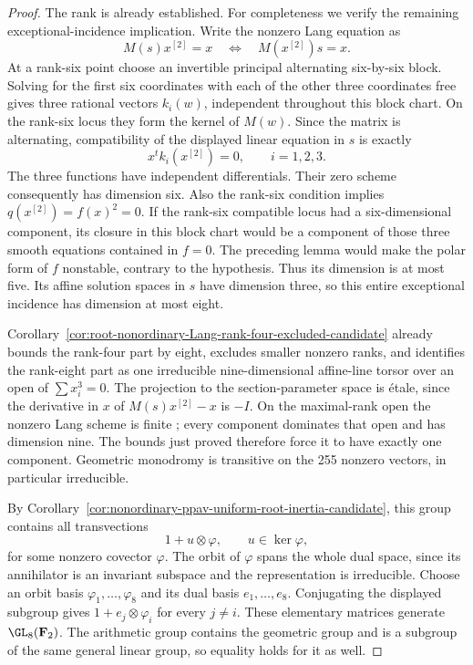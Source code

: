 \begin{proof}
The rank is already established. For completeness we verify the
remaining exceptional-incidence implication. Write the nonzero
Lang equation as
\[
                 M(s)x^{[2]}=x
       \quad\Longleftrightarrow\quad M(x^{[2]})s=x.
\]
At a rank-six point choose an invertible principal alternating
six-by-six block. Solving for the first six coordinates with each
of the other three coordinates free gives three rational vectors
$k_i(w)$, independent throughout this block chart. On the rank-six
locus they form the kernel of $M(w)$. Since the matrix is alternating,
compatibility of the displayed linear equation in $s$ is exactly
\[
                    x^t k_i(x^{[2]})=0,\qquad i=1,2,3.
\]
The three functions have independent differentials. Their zero
scheme consequently has dimension six. Also the rank-six condition
implies $q(x^{[2]})=f(x)^2=0$.
If the rank-six compatible locus had a six-dimensional component,
its closure in this block chart would be a component of those three
smooth equations contained in $f=0$. The preceding lemma would make
the polar form of $f$ nonstable, contrary to the hypothesis. Thus
its dimension is at most five. Its affine solution spaces in $s$
have dimension three, so this entire exceptional incidence has
dimension at most eight.

Corollary~\ref{cor:root-nonordinary-Lang-rank-four-excluded-candidate}
already bounds the rank-four part by eight, excludes smaller nonzero
ranks, and identifies the rank-eight part as one irreducible
nine-dimensional affine-line torsor over an open of
$\sum x_i^3=0$. The projection to the section-parameter space is
\'etale, since the derivative in $x$ of $M(s)x^{[2]}-x$ is $-I$.
On the maximal-rank open the nonzero Lang scheme is finite \etale;
every component dominates that open and has dimension nine.
The bounds just proved therefore force it to have exactly one
component. Geometric monodromy is transitive on the 255 nonzero
vectors, in particular irreducible.

By Corollary~\ref{cor:nonordinary-ppav-uniform-root-inertia-candidate},
this group contains all transvections
\[
             1+u\otimes\varphi,\qquad u\in\ker\varphi,
\]
for some nonzero covector $\varphi$. The orbit of $\varphi$ spans
the whole dual space, since its annihilator is an invariant subspace
and the representation is irreducible. Choose an orbit basis
$\varphi_1,\ldots,\varphi_8$ and its dual basis $e_1,\ldots,e_8$.
Conjugating the displayed subgroup gives
$1+e_j\otimes\varphi_i$ for every $j\ne i$.
These elementary matrices generate $\GL_8(\mathbf F_2)$.
The arithmetic group contains the geometric group and is a subgroup
of the same general linear group, so equality holds for it as well.
\end{proof}

